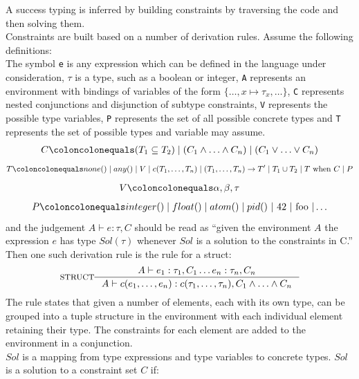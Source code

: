 \documentclass[12pt, titlepage]{article}
\begin{document}
\indent A success typing is inferred by building constraints by traversing the code and then solving them. \\
\indent Constraints are built based on a number of derivation rules. Assume the following definitions: \\
\indent The symbol \texttt{e} is any expression which can be defined in the language under consideration, $\tau$ is a type, such as a boolean or integer, \texttt{A} represents an environment with bindings of variables of the form $\{\ldots, x \mapsto \tau_x, \ldots\}$, \texttt{C} represents nested conjunctions and disjunction of subtype constraints, \texttt{V} represents the possible type variables, \texttt{P} represents the set of all possible concrete types and \texttt{T} represents the set of possible types and variable may assume.
\begin{align*} 
	C \coloncolonequals (T_1 \subseteq T_2) \mid (C_1 \land \ldots \land C_n) \mid (C_1 \lor \ldots \lor C_n)
\end{align*}
\begin{align*} 
	T \coloncolonequals none() \mid any() \mid V \mid c(T_1, \ldots, T_n) \mid (T_1, \ldots, T_n) \rightarrow T'\mid T_1 \cup T_2 \mid T \text{ when } C \mid P
\end{align*}
\begin{align*} 
	V \coloncolonequals \alpha, \beta, \tau
\end{align*}
\begin{align*} 
	P \coloncolonequals integer() \mid float() \mid atom() \mid pid()\text{ } | \text{ 42 } | \text{ foo } | \ldots
\end{align*}
and the judgement $A \vdash e : \tau, C$ should be read as ``given the environment $A$ the expression $e$ has type $Sol(\tau)$ whenever $Sol$ is a solution to the constraints in C.'' \\
Then one such derivation rule is the rule for a struct:
                \[
\inference*[STRUCT]{  A \vdash  e_1 : \tau_1, C_1 \ldots e_n : \tau_n, C_n}
                                        {A \vdash  c(e_1, \ldots, e_n) : c(\tau_1, \ldots, \tau_n), C_1 \land \ldots \land C_n}
                \]
The rule states that given a number of elements, each with its own type, can be grouped into a tuple structure in the environment with each individual element retaining their type. The constraints for each element are added to the environment in a conjunction. \\
$Sol$ is a mapping from type expressions and type variables to concrete types. $Sol$ is a solution to a constraint set $C$ if:
\end{document}
